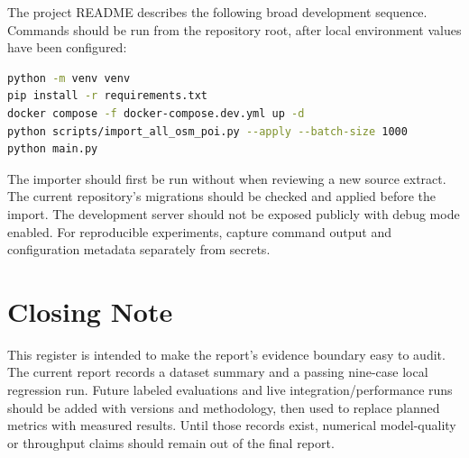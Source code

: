 The project README describes the following broad development sequence. Commands should be run from the repository root, after local environment values have been configured:

\begin{lstlisting}[language=bash,caption={Local development sequence documented by the project}]
python -m venv venv
pip install -r requirements.txt
docker compose -f docker-compose.dev.yml up -d
python scripts/import_all_osm_poi.py --apply --batch-size 1000
python main.py
\end{lstlisting}

The importer should first be run without  when reviewing a new source extract. The current repository's migrations should be checked and applied before the import. The development server should not be exposed publicly with debug mode enabled. For reproducible experiments, capture command output and configuration metadata separately from secrets.

\section{Closing Note}

This register is intended to make the report's evidence boundary easy to audit. The current report records a dataset summary and a passing nine-case local regression run. Future labeled evaluations and live integration/performance runs should be added with versions and methodology, then used to replace planned metrics with measured results. Until those records exist, numerical model-quality or throughput claims should remain out of the final report.
